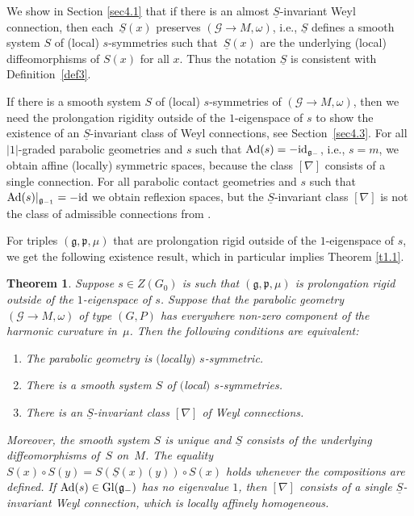 \documentclass[10pt,a4paper]{amsart}
\newcommand{\om}{\omega}
\newcommand{\un}{\underline}
\newcommand{\ba}{\mathcal{G}}
\newcommand{\fg}{\mathfrak g}
\newcommand{\fp}{\mathfrak p}
\newcommand{\Ad}{{\rm Ad}}
\newcommand{\id}{{\rm id}}
\numberwithin{equation}{section}
\newtheorem{Theorem}{Theorem}[section]
\begin{document}
We show in Section \ref{sec4.1} that if there is an almost $\un S$-invariant Weyl connection, then each~$\un S(x)$ preserves $(\ba\to M,\om)$, i.e., $\un S$ def\/ines a smooth system $S$ of (local) $s$-symmetries such that~$\un{S}(x)$ are the underlying (local) dif\/feomorphisms of $S(x)$ for all $x$. Thus the notation $\un S$ is consistent with Def\/inition~\ref{def3}.

If there is a smooth system $S$ of (local) $s$-symmetries of $(\ba\to M,\om)$, then we need the prolongation rigidity outside of the $1$-eigenspace of $s$ to show the existence of an $\un S$-invariant class of Weyl connections, see Section~\ref{sec4.3}. For all $|1|$-graded parabolic geometries and $s$ such that $\Ad(s)=-\id_{\fg_-}$, i.e., $s=m$, we obtain af\/f\/ine (locally) symmetric spaces, because the class $[\nabla]$ consists of a single connection. For all parabolic contact geometries and $s$ such that $\Ad(s)|_{\fg_{-1}}=-\id$ we obtain ref\/lexion spaces, but the $\un S$-invariant class $[\nabla]$ is not the class of admissible connections from \cite{Loos}.

For triples $(\fg,\fp,\mu)$ that are prolongation rigid outside of the $1$-eigenspace of $s$, we get the following existence result, which in particular implies Theorem \ref{t1.1}.

\begin{Theorem}\label{t1.3}
Suppose $s\in Z(G_0)$ is such that $(\fg,\fp,\mu)$ is prolongation rigid outside of the $1$-eigenspace of $s$. Suppose that the parabolic geometry $(\ba\to M,\om)$ of type $(G,P)$ has everywhere non-zero component of the harmonic curvature in~$\mu$. Then the following conditions are equivalent:
\begin{enumerate}\itemsep=0pt
\item[$1.$] The parabolic geometry is $($locally$)$ $s$-symmetric.
\item[$2.$] There is a smooth system $S$ of $($local$)$ $s$-symmetries.
\item[$3.$] There is an $\un S$-invariant class $[\nabla]$ of Weyl connections.
\end{enumerate}
Moreover, the smooth system $S$ is unique and $\un S$ consists of the underlying diffeomorphisms of~$S$ on~$M$. The equality $S(x) \circ S(y)=S(\un S(x)(y)) \circ S(x)$ holds whenever the compositions are defined. If $\Ad(s)\in {\rm Gl}(\fg_-)$ has no eigenvalue $1$, then $[\nabla]$ consists of a single $\un S$-invariant Weyl connection, which is locally affinely homogeneous.
\end{Theorem}
\end{document}
